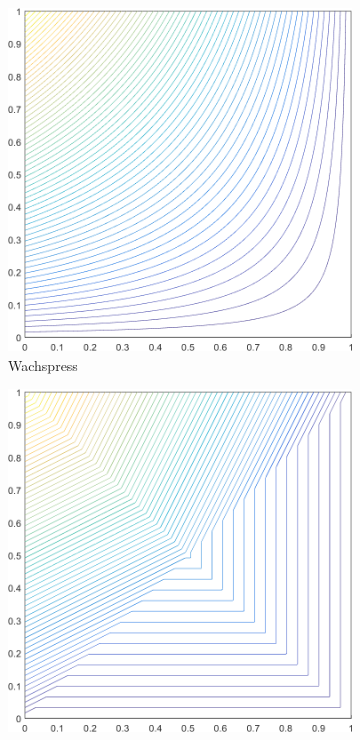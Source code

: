 \begin{figure}
\label{fig::2D_Linear_Summary_unit_square_basis_functions}
\centering
{
	\begin{subfigure}[b]{0.39\textwidth}
		\centering
		\includegraphics[width=\textwidth]{figures/sec_BF/square_WACHSPRESS1_contour_b4.png}
		\caption{Wachspress}
	\end{subfigure}
	\hspace{1.5cm}
	\begin{subfigure}[b]{0.39\textwidth}
		\centering
		\includegraphics[width=\textwidth]{figures/sec_BF/square_PWLD1_contour_b4.png}

\end{subfigure}}
\end{figure}

